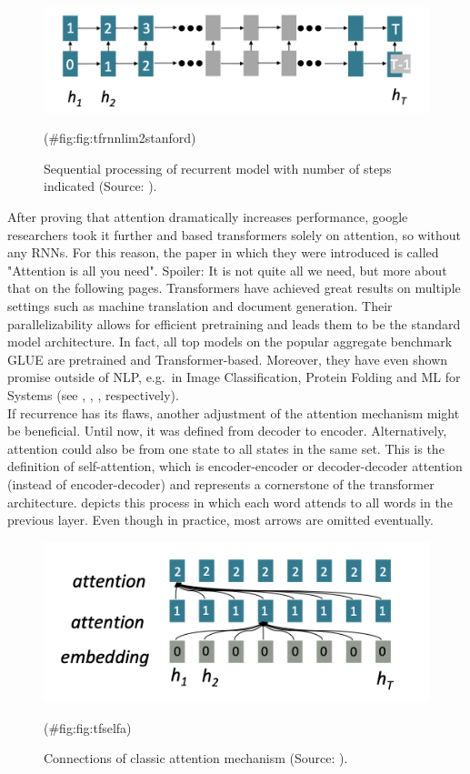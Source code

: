 \documentclass[
]{krantz}
\begin{document}
\begin{figure}

{\centering \includegraphics[width=0.7\linewidth]{./figures/01-01-nlp/transformer_rnnlim2_stanford} 

}

\caption{Sequential processing of recurrent model with number of steps indicated (Source: \citet{Manning2022}).}(\#fig:fig:tfrnnlim2stanford)
\end{figure}



After proving that attention dramatically increases performance, google
researchers took it further and based transformers solely on attention,
so without any RNNs. For this reason, the paper in which they were
introduced is called "Attention is all you need". Spoiler: It is not
quite all we need, but more about that on the following pages.
Transformers have achieved great results on multiple settings such as
machine translation and document generation. Their parallelizability
allows for efficient pretraining and leads them to be the standard model
architecture. In fact, all top models on the popular aggregate benchmark
GLUE are pretrained and Transformer-based. Moreover, they have even
shown promise outside of NLP, e.g.~in Image Classification, Protein
Folding and ML for Systems (see \citep{dosovitskiy2020image}, \citep{Jumper2021},
\citep{Zhou2020}, respectively).\\
If recurrence has its flaws, another adjustment of the attention
mechanism might be beneficial. Until now, it was defined from decoder to
encoder. Alternatively, attention could also be from one state to all
states in the same set. This is the definition of self-attention, which
is encoder-encoder or decoder-decoder attention (instead of
encoder-decoder) and represents a cornerstone of the transformer
architecture. depicts this process in which each word attends to all
words in the previous layer. Even though in practice, most arrows are
omitted eventually.\\

\begin{figure}

{\centering \includegraphics[width=0.7\linewidth]{./figures/01-01-nlp/transformer_self-attention_stanford} 

}

\caption{Connections of classic attention mechanism (Source: \citet{Manning2022}).}(\#fig:fig:tfselfa)
\end{figure}
\end{document}
